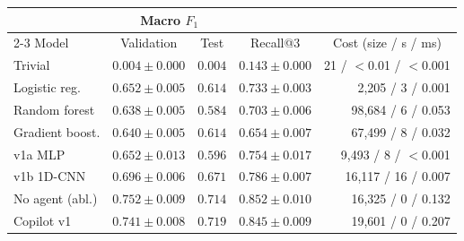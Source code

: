 \begin{tabular}{@{}lcccr@{}}
\toprule
& \multicolumn{2}{c}{Macro $F_1$} & & \\
\cmidrule(lr){2-3}
Model & Validation & Test & Recall@3 & \multicolumn{1}{c}{Cost (size / s / ms)} \\
\midrule
Trivial         & $0.004 \pm 0.000$ & $0.004$ & $0.143 \pm 0.000$ & 21 / $<$0.01 / $<$0.001 \\
Logistic reg.   & $0.652 \pm 0.005$ & $0.614$ & $0.733 \pm 0.003$ & 2,205 / 3 / 0.001 \\
Random forest   & $0.638 \pm 0.005$ & $0.584$ & $0.703 \pm 0.006$ & 98,684 / 6 / 0.053 \\
Gradient boost. & $0.640 \pm 0.005$ & $0.614$ & $0.654 \pm 0.007$ & 67,499 / 8 / 0.032 \\
\midrule
v1a MLP         & $0.652 \pm 0.013$ & $0.596$ & $0.754 \pm 0.017$ & 9,493 / 8 / $<$0.001 \\
v1b 1D-CNN      & $0.696 \pm 0.006$ & $0.671$ & $0.786 \pm 0.007$ & 16,117 / 16 / 0.007 \\
\midrule
No agent (abl.) & $\mathbf{0.752 \pm 0.009}$ & $0.714$ & $\mathbf{0.852 \pm 0.010}$ & 16,325 / 0 / 0.132 \\
Copilot v1      & $0.741 \pm 0.008$ & $\mathbf{0.719}$ & $0.845 \pm 0.009$ & 19,601 / 0 / 0.207 \\
\bottomrule
\end{tabular}
